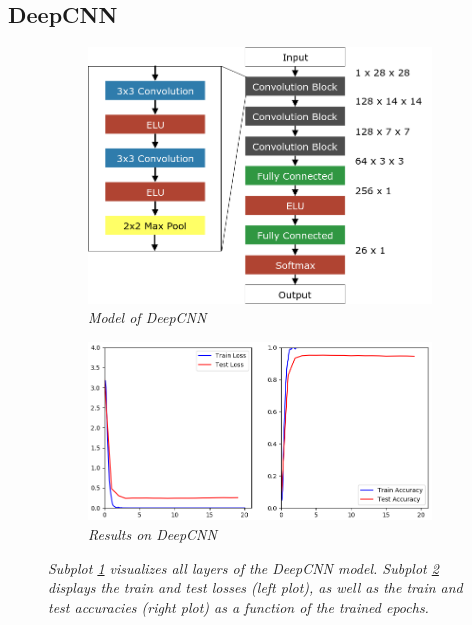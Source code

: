 \documentclass[a4paper]{article}
\begin{document}
\subsection{DeepCNN}\label{sec:deepCNN}

\begin{figure}
    \centering
    \hspace{-1cm}
    \begin{subfigure}[b]{0.4\textwidth}
        \includegraphics[height=0.25\paperwidth]{graphics/nets/CNN13}
        \caption{\textit{Model of DeepCNN}}
        \label{fig:deepCNN_model}
    \end{subfigure}
    \begin{subfigure}[b]{0.5\textwidth}
        \includegraphics[height=0.25\paperwidth]{graphics/nets/CNN13_Results}
        \caption{\textit{Results on DeepCNN}}
        \label{fig:deepCNN_results}
    \end{subfigure}
    \caption{\textit{Subplot \ref{fig:deepCNN_model} visualizes all layers of the DeepCNN model. Subplot \ref{fig:deepCNN_results} displays the train and test losses (left plot), as well as the train and test accuracies (right plot) as a function of the trained epochs.}}\label{fig:deepCNN}
\end{figure}
\end{document}

